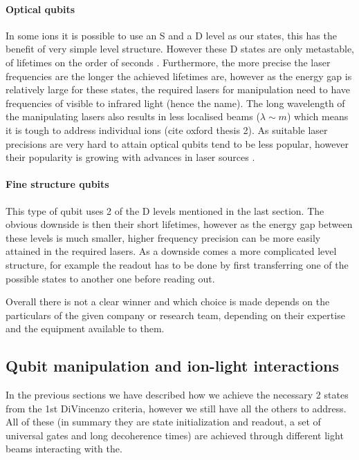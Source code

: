 \paragraph{Optical qubits}
In some ions it is possible to use an S and a D level as our states, this has the benefit of very simple level structure.
However these D states are only metastable, of lifetimes on the order of seconds \cite{ozeriTrappedionQubitTool2011}.
Furthermore, the more precise the laser frequencies are the longer the achieved lifetimes are, however as the energy gap is relatively large for these states, the required lasers for manipulation need to have frequencies of visible to infrared light (hence the name).
The long wavelength of the manipulating lasers also results in less localised beams ($\lambda \sim \si{m}$) which means it is tough to address individual ions (cite oxford thesis 2).
As suitable laser precisions are very hard to attain optical qubits tend to be less popular, however their popularity is growing with advances in laser sources \cite{bruzewiczTrappedionQuantumComputing2019}.

\paragraph{Fine structure qubits}
This type of qubit uses 2 of the D levels mentioned in the last section.
The obvious downside is then their short lifetimes, however as the energy gap between these levels is much smaller, higher frequency precision can be more easily attained in the required lasers.
As a downside comes a more complicated level structure, for example the readout has to be done by first transferring one of the possible states to another one before reading out.


Overall there is not a clear winner and which choice is made depends on the particulars of the given company or research team, depending on their expertise and the equipment available to them.


\subsection{Qubit manipulation and ion-light interactions}
In the previous sections we have described how we achieve the necessary 2 states from the 1st DiVincenzo criteria, however we still have all the others to address.
All of these (in summary they are state initialization and readout, a set of universal gates and long decoherence times) are achieved through different light beams interacting with the.

